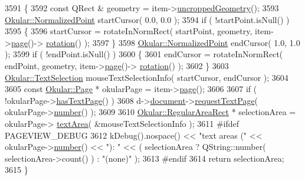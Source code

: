 \begin{DoxyCode}
3591 \{
3592     \textcolor{keyword}{const} QRect & geometry = item->\hyperlink{classPageViewItem_a5d2e73a003f65b4e95c0c21b1698f835}{uncroppedGeometry}();
3593     \hyperlink{classOkular_1_1NormalizedPoint}{Okular::NormalizedPoint} startCursor( 0.0, 0.0 );
3594     \textcolor{keywordflow}{if} ( !startPoint.isNull() )
3595     \{
3596         startCursor = rotateInNormRect( startPoint, geometry, item->\hyperlink{classPageViewItem_a5c512d95e5563e8d19d1fb3d93dafc31}{page}()->
      \hyperlink{classOkular_1_1Page_a731947e32744bdcda791d22a2dc88726}{rotation}() );
3597     \}
3598     \hyperlink{classOkular_1_1NormalizedPoint}{Okular::NormalizedPoint} endCursor( 1.0, 1.0 );
3599     \textcolor{keywordflow}{if} ( !endPoint.isNull() )
3600     \{
3601         endCursor = rotateInNormRect( endPoint, geometry, item->\hyperlink{classPageViewItem_a5c512d95e5563e8d19d1fb3d93dafc31}{page}()->
      \hyperlink{classOkular_1_1Page_a731947e32744bdcda791d22a2dc88726}{rotation}() );
3602     \}
3603     \hyperlink{classOkular_1_1TextSelection}{Okular::TextSelection} mouseTextSelectionInfo( startCursor, endCursor );
3604 
3605     \textcolor{keyword}{const} \hyperlink{classOkular_1_1Page}{Okular::Page} * okularPage = item->\hyperlink{classPageViewItem_a5c512d95e5563e8d19d1fb3d93dafc31}{page}();
3606 
3607     \textcolor{keywordflow}{if} ( !okularPage->\hyperlink{classOkular_1_1Page_a44163bc0e76204a9d9c42da442ee734a}{hasTextPage}() )
3608         d->\hyperlink{classPageViewPrivate_a50645b9853306cffd74e51efb677e5b4}{document}->\hyperlink{classOkular_1_1Document_ad4909d8411d3ad8faf716f30a6e9f417}{requestTextPage}( okularPage->\hyperlink{classOkular_1_1Page_a6eee5f157a130b47d81ddd63e501664b}{number}() );
3609 
3610     \hyperlink{classOkular_1_1RegularAreaRect}{Okular::RegularAreaRect} * selectionArea = okularPage->
      \hyperlink{classOkular_1_1Page_a117cec50481eeea1e1ca9881eaeceb9e}{textArea}( &mouseTextSelectionInfo );
3611 \textcolor{preprocessor}{#ifdef PAGEVIEW\_DEBUG}
3612     kDebug().nospace() << \textcolor{stringliteral}{"text areas ("} << okularPage->\hyperlink{classOkular_1_1Page_a6eee5f157a130b47d81ddd63e501664b}{number}() << \textcolor{stringliteral}{"): "} << ( selectionArea ? 
      QString::number( selectionArea->count() ) : \textcolor{stringliteral}{"(none)"} );
3613 \textcolor{preprocessor}{#endif}
3614     \textcolor{keywordflow}{return} selectionArea;
3615 \}
\end{DoxyCode}
